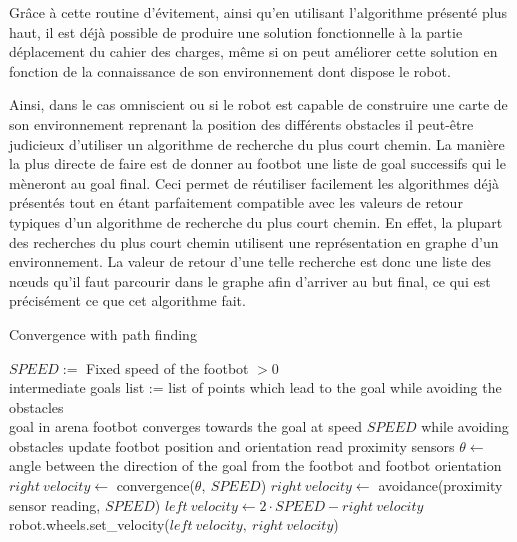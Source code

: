Grâce à cette routine d'évitement, ainsi qu'en utilisant l'algorithme présenté plus haut, il est déjà possible de produire une solution fonctionnelle à la partie déplacement du cahier des charges, même si on peut améliorer cette solution en fonction de la connaissance de son environnement dont dispose le robot.

Ainsi, dans le cas omniscient ou si le robot est capable de construire une carte de son environnement reprenant la position des différents obstacles il peut-être judicieux d'utiliser un algorithme de recherche du plus court chemin. La manière la plus directe de faire est de donner au footbot une liste de goal successifs qui le mèneront au goal final. Ceci  permet de réutiliser facilement les algorithmes déjà présentés tout en étant parfaitement compatible avec les valeurs de retour typiques d'un algorithme de recherche du plus court chemin. En effet, la plupart des recherches du plus court chemin utilisent une représentation en graphe d'un environnement. La valeur de retour d'une telle recherche est donc une liste des nœuds qu'il faut parcourir dans le graphe afin d'arriver au but final, ce qui est précisément ce que cet algorithme fait.
\begin{algorithm}                    
\caption{Convergence with path finding}
\label{pathConvergence}
\begin{algorithmic}[1]
  \REQUIRE \(SPEED :=\) Fixed speed of the footbot \(> 0\)\\intermediate goals list := list of points which lead to the goal while avoiding the obstacles\\goal in arena
  \ENSURE footbot converges towards the goal at speed \(SPEED\) while avoiding obstacles
    \STATE update footbot position and orientation
    \STATE read proximity sensors 
      \STATE \( \theta \leftarrow\) angle between the direction of the goal from the footbot and footbot orientation
      \STATE \( right\:velocity \leftarrow\) convergence(\(\theta,\:SPEED\))
    \ELSE
      \STATE \( right\:velocity \leftarrow\) avoidance(proximity sensor reading, \(SPEED\))
    \ENDIF
    \STATE \( left\:velocity \leftarrow 2\cdot SPEED-right\:velocity\) 
    \STATE robot.wheels.set\_velocity(\(left\:velocity,\:right\:velocity\))
  \ENDWHILE
  \ENDFOR
\end{algorithmic}
\end{algorithm}

